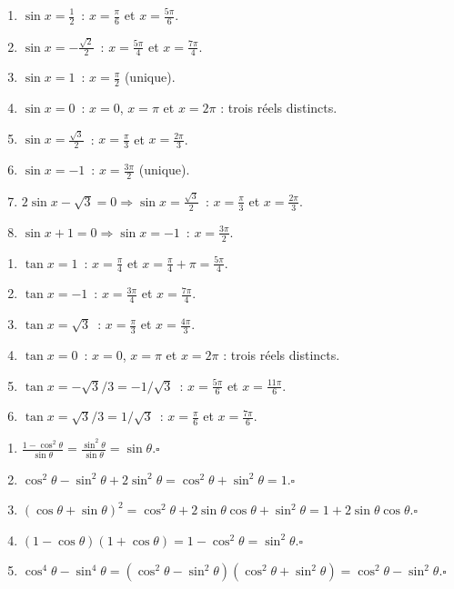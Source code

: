 
\begin{enumerate}
  \item $\sin x=\frac{1}{2}$~: $x=\frac{\pi}{6}$ et $x=\frac{5\pi}{6}$.
  \item $\sin x=-\frac{\sqrt{2}}{2}$~: $x=\frac{5\pi}{4}$ et $x=\frac{7\pi}{4}$.
  \item $\sin x=1$~: $x=\frac{\pi}{2}$ (unique).
  \item $\sin x=0$~: $x=0$, $x=\pi$ et $x=2\pi$ : trois r\'eels distincts.
  \item $\sin x=\frac{\sqrt{3}}{2}$~: $x=\frac{\pi}{3}$ et $x=\frac{2\pi}{3}$.
  \item $\sin x=-1$~: $x=\frac{3\pi}{2}$ (unique).
  \item $2\sin x-\sqrt{3}=0\Rightarrow\sin x=\frac{\sqrt{3}}{2}$~: $x=\frac{\pi}{3}$ et $x=\frac{2\pi}{3}$.
  \item $\sin x+1=0\Rightarrow\sin x=-1$~: $x=\frac{3\pi}{2}$.
\end{enumerate}


\begin{enumerate}
  \item $\tan x=1$~: $x=\frac{\pi}{4}$ et $x=\frac{\pi}{4}+\pi=\frac{5\pi}{4}$.
  \item $\tan x=-1$~: $x=\frac{3\pi}{4}$ et $x=\frac{7\pi}{4}$.
  \item $\tan x=\sqrt{3}$~: $x=\frac{\pi}{3}$ et $x=\frac{4\pi}{3}$.
  \item $\tan x=0$~: $x=0$, $x=\pi$ et $x=2\pi$ : trois r\'eels distincts.
  \item $\tan x=-\sqrt{3}/3=-1/\sqrt{3}$~: $x=\frac{5\pi}{6}$ et $x=\frac{11\pi}{6}$.
  \item $\tan x=\sqrt{3}/3=1/\sqrt{3}$~: $x=\frac{\pi}{6}$ et $x=\frac{7\pi}{6}$.
\end{enumerate}


\begin{enumerate}
  \item $\frac{1-\cos^2\theta}{\sin\theta}=\frac{\sin^2\theta}{\sin\theta}=\sin\theta$.\hfill$\square$
  \item $\cos^2\theta-\sin^2\theta+2\sin^2\theta=\cos^2\theta+\sin^2\theta=1$.\hfill$\square$
  \item $(\cos\theta+\sin\theta)^2=\cos^2\theta+2\sin\theta\cos\theta+\sin^2\theta=1+2\sin\theta\cos\theta$.\hfill$\square$
  \item $(1-\cos\theta)(1+\cos\theta)=1-\cos^2\theta=\sin^2\theta$.\hfill$\square$
  \item $\cos^4\theta-\sin^4\theta=(\cos^2\theta-\sin^2\theta)(\cos^2\theta+\sin^2\theta)=\cos^2\theta-\sin^2\theta$.\hfill$\square$
\end{enumerate}

